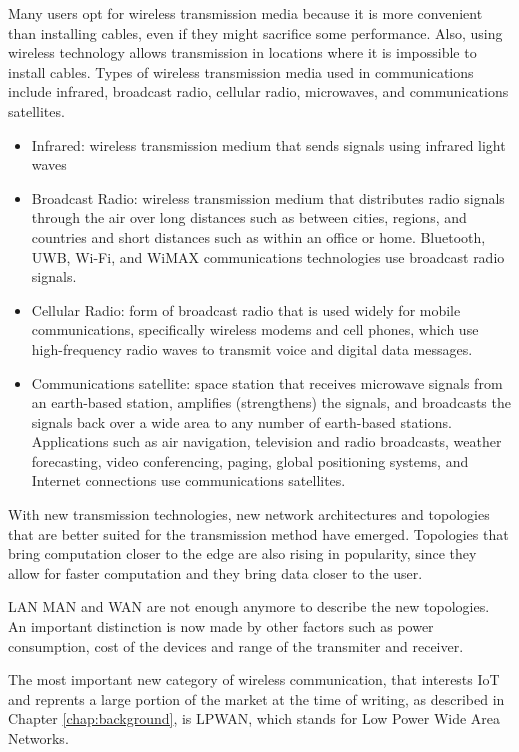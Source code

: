 		Many users opt for wireless transmission media because it is more convenient than installing cables, even if they might sacrifice some performance. 
		Also, using wireless technology allows transmission in locations where it is impossible to install cables.
		Types of wireless transmission media used in communications include infrared, broadcast radio, cellular radio, microwaves, and communications satellites.
		\begin{itemize}[noitemsep]
			\item Infrared: wireless transmission medium that sends signals using infrared light waves
			\item Broadcast Radio: wireless transmission medium that distributes radio signals through the air over long distances such as between cities, regions, and countries and short distances such as within an office or home. Bluetooth, UWB, Wi-Fi, and WiMAX communications technologies use broadcast radio signals.
			\item Cellular Radio: form of broadcast radio that is used widely for mobile communications, specifically wireless modems and cell phones, which use high-frequency radio waves to transmit voice and digital data messages.
			\item Communications satellite: space station that receives microwave signals from an earth-based station, amplifies (strengthens) the signals, and broadcasts the signals back over a wide area to any number of earth-based stations.
			Applications such as air navigation, television and radio broadcasts, weather forecasting, video conferencing, paging, global positioning systems, and Internet connections use communications satellites.
		\end{itemize}
		
		With new transmission technologies, new network architectures and topologies that are better suited for the transmission method have emerged.
		Topologies that bring computation closer to the edge are also rising in popularity, since they allow for faster computation and they bring data closer to the user.
		
		LAN MAN and WAN are not enough anymore to describe the new topologies.
		An important distinction is now made by other factors such as power consumption, cost of the devices and range of the transmiter and receiver.
		
		The most important new category of wireless communication, that interests IoT and reprents a large portion of the market at the time of writing, as described in Chapter \ref{chap:background}, is LPWAN, which stands for Low Power Wide Area Networks.
		
